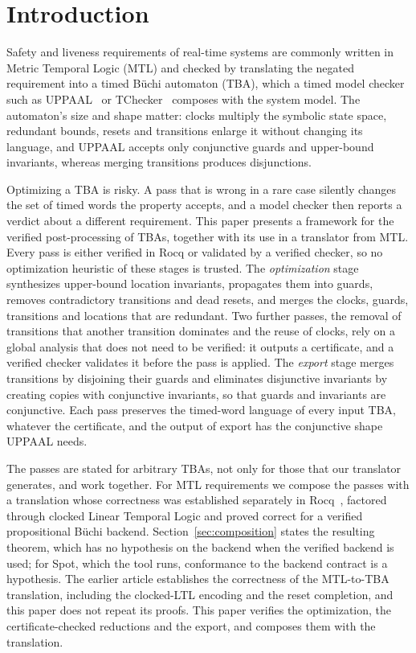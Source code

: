 \documentclass[preprint,12pt]{elsarticle}
\begin{document}
\section{Introduction}
\label{sec:introduction}
Safety and liveness requirements of real-time systems are commonly written in Metric Temporal Logic (MTL) and checked by translating the negated requirement into a timed B\"uchi automaton (TBA), which a timed model checker such as UPPAAL~\cite{[BGD04]} or TChecker~\cite{tchecker} composes with the system model. The automaton's size and shape matter: clocks multiply the symbolic state space, redundant bounds, resets and transitions enlarge it without changing its language, and UPPAAL accepts only conjunctive guards and upper-bound invariants, whereas merging transitions produces disjunctions.

Optimizing a TBA is risky. A pass that is wrong in a rare case silently changes the set of timed words the property accepts, and a model checker then reports a verdict about a different requirement. 
This paper presents a framework for the verified post-processing of TBAs, together with its use in a translator from MTL. Every pass is either verified in Rocq or validated by a verified checker, so no optimization heuristic of these stages is trusted. The \emph{optimization} stage synthesizes upper-bound location invariants, propagates them into guards, removes contradictory transitions and dead resets, and merges the clocks, guards, transitions and locations that are redundant. Two further passes, the removal of transitions that another transition dominates and the reuse of clocks, rely on a global analysis that does not need to be verified: it outputs a certificate, and a verified checker validates it before the pass is applied. The \emph{export} stage merges transitions by disjoining their guards and eliminates disjunctive invariants by creating copies with conjunctive invariants, so that guards and invariants are conjunctive. Each pass preserves the timed-word language of every input TBA, whatever the certificate, and the output of export has the conjunctive shape UPPAAL needs.

The passes are stated for arbitrary TBAs, not only for those that our translator generates, and work together. For MTL requirements we compose the passes with a translation whose correctness was established separately in Rocq~\cite{faresmtl}, factored through clocked Linear Temporal Logic and proved correct for a verified propositional B\"uchi backend. Section~\ref{sec:composition} states the resulting theorem, which has no hypothesis on the backend when the verified backend is used; for Spot, which the tool runs, conformance to the backend contract is a hypothesis. The earlier article establishes the correctness of the MTL-to-TBA translation, including the clocked-LTL encoding and the reset completion, and this paper does not repeat its proofs. This paper verifies the optimization, the certificate-checked reductions and the export, and composes them with the translation.
\end{document}
